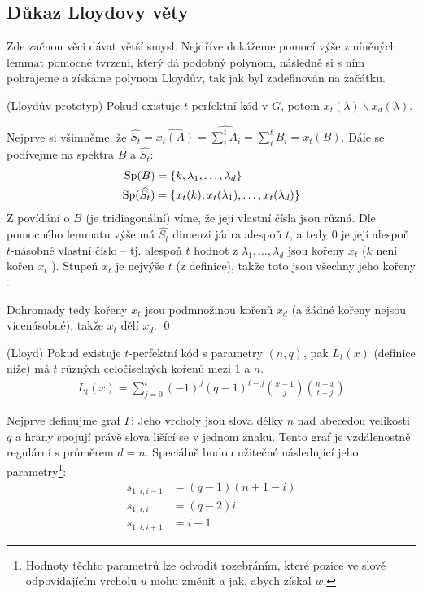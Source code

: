 \subsection{Důkaz Lloydovy věty}


Zde začnou věci dávat větší smysl. Nejdříve dokážeme pomocí výše zmíněných lemmat
pomocné tvrzení, který dá podobný polynom, následně si s ním pohrajeme a získáme
polynom Lloydův, tak jak byl zadefinován na začátku.

\vt (Lloydův prototyp) Pokud existuje $t$-perfektní kód v $G$, potom
$x_t(\lambda)\backslash x_d(\lambda)$.

\dk Nejprve si všimněme, že
$\widehat{S_t} = \widehat{x_t(A)} = \widehat{\sum_i^t A_i} = \sum_i^t B_i = x_t(B)$.
Dále se podívejme na spektra $B$ a $\widehat{S_t}$:
\begin{align}
	\operatorname{Sp}(B) &= \{ k, \lambda_1, \ldots, \lambda_d \} \\
	\operatorname{Sp}(\widehat{S_t}) &= \{ x_t(k), x_t(\lambda_1), \ldots, x_t(\lambda_d) \}
\end{align}
Z povídání o $B$ (je tridiagonální) víme, že její vlastní čísla jsou různá.
Dle pomocného lemmatu výše má $\widehat{S_t}$ dimenzi jádra alespoň $t$,
a tedy 0 je její alespoň $t$-násobné vlastní číslo -- tj. alespoň $t$ hodnot
z $\lambda_1, \ldots, \lambda_d$ jsou kořeny $x_t$ ($k$ není kořen $x_t$ ).
Stupeň $x_t$ je nejvýše $t$ (z definice), takže toto jsou všechny jeho kořeny
.

Dohromady tedy kořeny $x_t$ jsou podmnožinou kořenů $x_d$ (a žádné kořeny nejsou
více\-ná\-so\-bné), takže $x_t$ dělí $x_d$. \qed


\vt (Lloyd) Pokud existuje $t$-perfektní kód s parametry $(n,q)$, pak $L_t(x)$
(definice níže) má $t$ různých celočíselných kořenů mezi $1$ a $n$.
\begin{align}
	L_t(x) = \sum_{j=0}^t(-1)^j(q-1)^{t-j}\binom{x-1}{j}\binom{n-x}{t-j}
\end{align}

\dk Nejprve definujme graf $\Gamma$: Jeho vrcholy jsou slova délky $n$ nad abecedou
velikosti $q$ a hrany spojují právě slova lišící se v jednom znaku. Tento graf
je vzdálenostně regulární s průměrem $d = n$.
Speciálně budou užitečné následující jeho parametry\footnote{
Hodnoty těchto parametrů lze odvodit rozebráním, které pozice ve slově odpovídajícím
vrcholu $u$ mohu změnit a jak, abych získal $w$.
}:
\begin{align}
  s_{1,i,i-1} &= (q-1)(n + 1 - i) \\
  s_{1,i,i}   &= (q-2)i \\
  s_{1,i,i+1} &= i + 1
\end{align}

